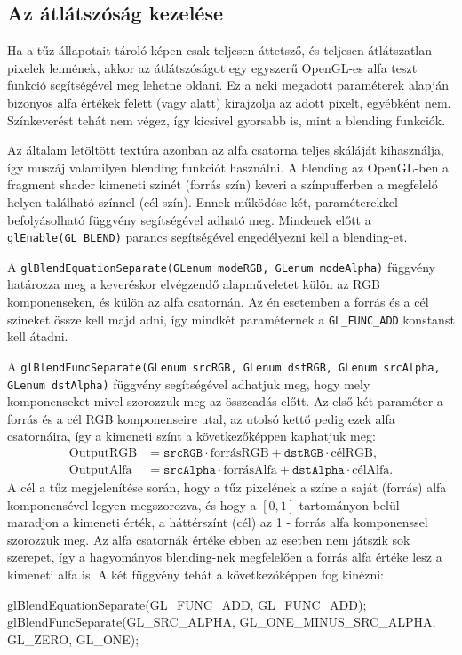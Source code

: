 \subsection{Az átlátszóság kezelése}

Ha a tűz állapotait tároló képen csak teljesen áttetsző, és teljesen átlátszatlan pixelek lennének, akkor az átlátszóságot egy egyszerű OpenGL-es alfa teszt funkció segítségével meg lehetne oldani. Ez a neki megadott paraméterek alapján bizonyos alfa értékek felett (vagy alatt) kirajzolja az adott pixelt, egyébként nem. Színkeverést tehát nem végez, így kicsivel gyorsabb is, mint a blending funkciók.

Az általam letöltött textúra azonban az alfa csatorna teljes skáláját kihasználja, így muszáj valamilyen blending funkciót használni. A blending az OpenGL-ben a fragment shader kimeneti színét (forrás szín) keveri a színpufferben a megfelelő helyen található színnel (cél szín). Ennek működése két, paraméterekkel befolyásolható függvény segítségével adható meg. Mindenek előtt a \texttt{glEnable(GL\_BLEND)} parancs segítségével engedélyezni kell a blending-et.

A \texttt{glBlendEquationSeparate(GLenum modeRGB, GLenum modeAlpha)} függvény határozza meg a keveréskor elvégzendő alapműveletet külön az RGB komponenseken, és külön az alfa csatornán. Az én esetemben a forrás és a cél színeket össze kell majd adni, így mindkét paraméternek a \texttt{GL\_FUNC\_ADD} konstanst kell átadni.

A \texttt{glBlendFuncSeparate(GLenum srcRGB, GLenum dstRGB, GLenum srcAlpha,\\ GLenum dstAlpha)} függvény segítségével adhatjuk meg, hogy mely komponenseket mivel szorozzuk meg az összeadás előtt. Az első két paraméter a forrás és a cél RGB komponenseire utal, az utolsó kettő pedig ezek alfa csatornáira, így a kimeneti színt a következőképpen kaphatjuk meg: 
\begin{align*}
\text{OutputRGB} &= \texttt{srcRGB} \cdot \text{forrásRGB} + \texttt{dstRGB} \cdot \text{célRGB}, \\
\text{OutputAlfa} &= \texttt{srcAlpha} \cdot \text{forrásAlfa} + \texttt{dstAlpha} \cdot \text{célAlfa}.
\end{align*}
A cél a tűz megjelenítése során, hogy a tűz pixelének a színe a saját (forrás) alfa komponensével legyen megszorozva, és hogy a $[0, 1]$ tartományon belül maradjon a kimeneti érték, a háttérszínt (cél) az 1 - forrás alfa komponenssel szorozzuk meg. Az alfa csatornák értéke ebben az esetben nem játszik sok szerepet, így a hagyományos blending-nek megfelelően a forrás alfa értéke lesz a kimeneti alfa is. A két függvény tehát a következőképpen fog kinézni:
\begin{cpp}
glBlendEquationSeparate(GL_FUNC_ADD, GL_FUNC_ADD);
glBlendFuncSeparate(GL_SRC_ALPHA, GL_ONE_MINUS_SRC_ALPHA,
	 GL_ZERO, GL_ONE);
\end{cpp}

